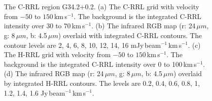 \documentclass[manuscript]{aastex61}
\newcommand{\kms}{\,km\,s$^{-1}$}
\newcommand{\um}{\mu m}
\begin{document}
\begin{figure}[htbp]
\centering
{}
\\
\\ 
\caption{The C-RRL region G34.2+0.2.
          (a) The C-RRL grid with velocity from $-50$ to $150$\kms.
	  The background is the integrated C-RRL intensity over 30 to 70\kms.
	  (b) The infrared RGB map (r: 24\,$\um$, g: 8\,$\um$, b: 4.5\,$\um$) overlaid with integrated C-RRL contours.
	  The contour levels are 2, 4, 6, 8, 10, 12, 14, 16 mJy\,beam$^{-1}$\kms.
	  (c) The H-RRL grid with velocity from $-50$ to $150$\kms.
	  The background is the integrated C-RRL intensity over 0 to 100\kms.
	  (d) The infrared RGB map (r: 24\,$\um$, g: 8\,$\um$, b: 4.5\,$\um$) overlaid by integrated H-RRL contours.
	  The levels are 0.2, 0.4, 0.6, 0.8, 1, 1.2, 1.4, 1.6 Jy\,beam$^{-1}$\kms.
	  }
\label{fig_crrl-g342}
\end{figure}
\end{document}
